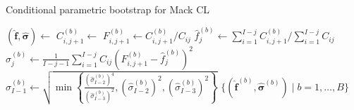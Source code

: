 \documentclass[a4paper]{book}
\begin{document}
\begin{algorithm}[!htb]
  \caption{Conditional parametric bootstrap for Mack CL} 
  \label{alg:cond-param-mack}
  \begin{algorithmic} 
    \vspace{5pt}
    \State $(\bm{\widehat{f}}, \bm{\widehat{\sigma}}) \gets$  
    \vspace{5pt}
      \vspace{5pt}
          \vspace{5pt}
          \State $C^{(b)}_{i, j + 1} \gets$ 
          \vspace{5pt}
          \State $\displaystyle F^{(b)}_{i, j + 1} \gets C^{(b)}_{i, j + 1} / C_{ij}$
          \vspace{5pt}
        \EndFor
        \vspace{5pt}
        \State $\widehat{f}^{(b)}_j \gets \sum_{i = 1}^{I - j} C^{(b)}_{i, j + 1} / \sum_{i = 1}^{I - j} C_{ij}$
        \vspace{5pt}
          \vspace{5pt}
          \State $\displaystyle \widehat{\sigma}^{(b)}_j \gets \frac{1}{I - j - 1}\sum_{i = 1}^{I - j} C_{ij} \left( F^{(b)}_{i, j + 1} - \widehat{f}^{(b)}_j \right)^2$
          \vspace{5pt}
        \Else
          \vspace{5pt}
          \State $\widehat{\sigma}^{(b)}_{I - 1} \gets \sqrt{\min{ \left \{ \displaystyle \frac{(\widehat{\sigma}^{(b)}_{I - 2})^4}{(\widehat{\sigma}^{(b)}_{I - 3})^2}, (\widehat{\sigma}^{(b)}_{I - 2})^2, (\widehat{\sigma}^{(b)}_{I - 3})^2 \right \} }}$
          \vspace{5pt}
          \EndIf
        \EndFor
    \EndFor
    \State \Return $\{ (\widehat{\bm{f}}^{(b)}, \widehat{\bm{\sigma}}^{(b)}) \mid b = 1, \dots, B \}$
  \end{algorithmic}
\end{algorithm}
%
\end{document}

